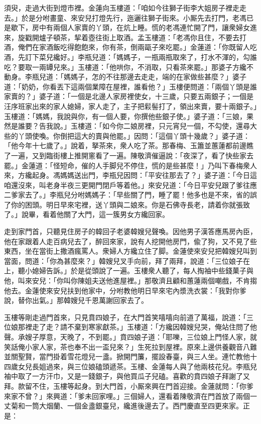 須臾，走過大街到燈市裡。金蓮向玉樓道：「咱如今往獅子街李大姐房子裡走走去。」於是分咐畫童、來安兒打燈先行，迤邐往獅子街來。小厮先去打門，老馮已是歇下，房中有兩個人家賣的丫頭，在炕上睡。慌的老馮連忙開了門，讓衆婦女進來，旋戳開爐子頓茶，挈着壺往街上取酒。孟玉樓道：「老馮你且住，不要去打酒，俺們在家酒飯吃得飽飽來，你有茶，倒兩甌子來吃罷。」金蓮道：「你既留人吃酒，先訂下菜兒纔好。」李瓶兒道：「媽媽子，一瓶兩瓶取來了，打水不渾的，勾誰吃？要取一兩罈兒來。」{}玉樓道：「他哄你，不消取，只看茶來罷。」那婆子方纔不動身。李瓶兒道：「媽媽子，怎的不往那邊去走走，端的在家做些甚麼？」婆子道：「奶奶，你看丟下這兩個業障在屋裡，誰看他？」玉樓便問道：「兩個丫頭是誰家賣的？」婆子道：「一個是北邊人家房裡使女，十三歲，只要五兩銀子；一個是汪序班家出來的家人媳婦，家人走了，主子把鬏髻打了，領出來賣，要十兩銀子。」玉樓道：「媽媽，我說與你，有一個人要，你撰他些銀子使。」婆子道：「三娘，果然是誰要？告我說。」玉樓道：「如今你二娘房裡，只元宵兒一個，不勾使，還尋大些的丫頭使喚。你倒把這大的賣與他罷。」因問：「這個丫頭十幾歲？」婆子道：「他今年十七歲了。」說着，拏茶來，衆人吃了茶。那春梅、玉簫並蕙蓮都前邊瞧了一遍，又到臨街樓上推開窻看了一遍。陳敬濟催逼說：「夜深了，看了快些家去罷。」金蓮道：「怪短命，催的人手脚兒不停住，慌的是些甚麼！」乃叫下春梅衆人來，方纔起身。馮媽媽送出門，李瓶兒因問：「平安往那去了？」婆子道：「今日這咱還沒來，叫老身半夜三更開門閉戶等着他。」來安兒道：「今日平安兒跟了爹往應二爹家去了。」李瓶兒分咐媽媽子：「早些關了門，睡了罷！他多也是不來，省的誤了你的困頭。明日早來宅裡，送丫頭與二娘來。你是石佛寺長老，請着你就張致了。」說畢，看着他關了大門，這一簇男女方纔回家。

走到家門首，只聽見住房子的韓回子老婆韓嫂兒聲喚。{}因他男子漢答應馬房內臣，他在家跟着人走百病兒去了，醉回來家，說有人挖開他房門，偸了狗，又不見了些東西，坐在當街上撒酒瘋罵人。衆婦人方纔立住了脚。金蓮使來安兒把韓嫂兒叫到當面，問道：「你為甚麼來？」韓嫂兒叉手向前，拜了兩拜，說道：「三位娘子在上，聽小媳婦告訴。」於是從頭說了一遍。玉樓衆人聽了，每人掏袖中些錢菓子與他，叫來安兒：「你叫你陳姐夫送他進屋裡。」那敬濟且顧和蕙蓮兩個嘲戲，不肯搊他去。金蓮使來安兒扶到他家中，分咐教他明日早來宅內漿洗衣裳：「我對你爹說，替你出氣。」那韓嫂兒千恩萬謝回家去了。

玉樓等剛走過門首來，只見賁四娘子，{}在大門首笑嘻嘻向前道了萬福，說道：「三位娘那裡走了走？請不棄到寒家獻茶。」玉樓道：「方纔因韓嫂兒哭，俺站住問了他聲。承嫂子厚意，天晚了，不到罷。」賁四娘子道：「耶嚛，三位娘上門怪人家，就笑話俺小家人家，茶也奉不出一盃兒來？」生死拉到屋裡。原來上邊供養觀音八難並關聖賢，當門掛着雪花燈兒一盞。掀開門簾，擺設春臺，與三人坐。連忙教他十四歲女兒長姐過來，與三位娘磕頭遞茶。玉樓、金蓮每人與了他兩枝花兒。李瓶兒袖中取了一方汗巾，又是一錢銀子，與他買瓜子兒磕。喜歡的賁四娘子拜謝了又拜。款留不住，玉樓等起身。到大門首，小厮來興在門首迎接。金蓮就問：「你爹來家不曾？」來興道：「爹未回家哩。」三個婦人，還看着陳敬濟在門首放了兩個一丈菊和一筒大烟蘭、一個金盞銀臺兒，纔進後邊去了。{}西門慶直至四更來家。正是：

